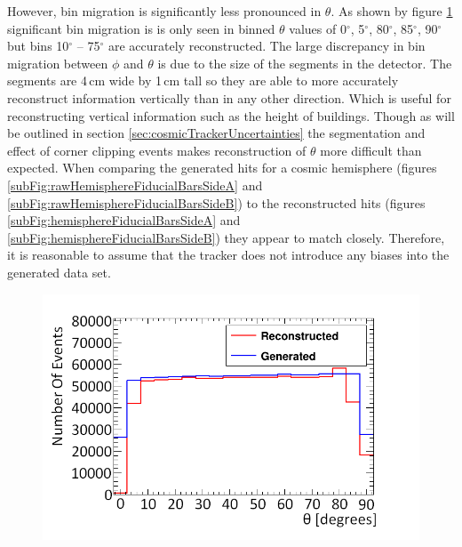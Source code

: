 However, bin migration is significantly less pronounced in $\theta$. As shown by figure \ref{fig:thetaGenVsRecoHem} significant bin migration is is only seen in binned $\theta$ values of 0$^\circ$, 5$^\circ$, 80$^\circ$, 85$^\circ$, 90$^\circ$ but bins 10$^\circ$ -- 75$^\circ$ are accurately reconstructed. The large discrepancy in bin migration between $\phi$ and $\theta$ is due to the size of the segments in the detector. The segments are 4\,cm wide by 1\,cm tall so they are able to more accurately reconstruct information vertically than in any other direction. Which is useful for reconstructing vertical information such as the height of buildings. Though as will be outlined in section \ref{sec:cosmicTrackerUncertainties} the segmentation and effect of corner clipping events makes reconstruction of $\theta$ more difficult than expected. When comparing the generated hits for a cosmic hemisphere (figures \ref{subFig:rawHemisphereFiducialBarsSideA} and \ref{subFig:rawHemisphereFiducialBarsSideB}) to the reconstructed hits (figures \ref{subFig:hemisphereFiducialBarsSideA} and \ref{subFig:hemisphereFiducialBarsSideB}) they appear to match closely. Therefore, it is reasonable to assume that the tracker does not introduce any biases into the generated data set.

\begin{figure}[!h]
 \centering
 \includegraphics[width=0.5\linewidth]{Chapter6/Figs/Raster/hemisphereThetaCompareMedText.png}
 \label{fig:thetaGenVsRecoHem}
\end{figure}

